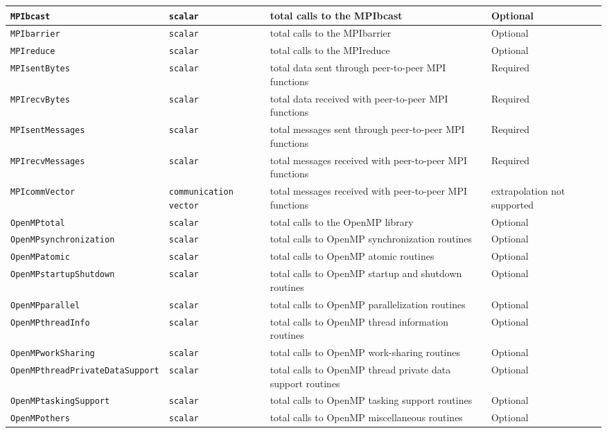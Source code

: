 \documentclass[a4paper, 10pt]{article}
\begin{document}
\begin{table}[t!]
\begin{tabular}{|p{3.8cm} | p{1.5cm} ||p{7.6cm}| p{1.7cm} |}
\hline
\texttt{MPIbcast} &\texttt{scalar} & total calls to the MPIbcast  & Optional \\
\hline
\texttt{MPIbarrier} &\texttt{scalar} & total calls to the MPIbarrier  & Optional \\
\hline
\texttt{MPIreduce} &\texttt{scalar} & total calls to the MPIreduce  & Optional \\
\hline
\texttt{MPIsentBytes} &\texttt{scalar} & total data sent through peer-to-peer MPI functions & Required \\
\hline
\texttt{MPIrecvBytes} &\texttt{scalar} & total data received with peer-to-peer MPI functions & Required \\
\hline
\texttt{MPIsentMessages} &\texttt{scalar} & total messages sent through peer-to-peer MPI functions & Required \\
\hline
\texttt{MPIrecvMessages} &\texttt{scalar} & total messages received with peer-to-peer MPI functions & Required \\
\hline
\texttt{MPIcommVector} &\texttt{communication vector} & total messages received with peer-to-peer MPI functions & extrapolation not supported \\
\hline
\texttt{OpenMPtotal} &\texttt{scalar} & total calls to the OpenMP library & Optional \\
\hline
\texttt{OpenMPsynchronization} &\texttt{scalar} & total calls to OpenMP synchronization routines & Optional \\
\hline
\texttt{OpenMPatomic} &\texttt{scalar} & total calls to OpenMP atomic routines & Optional \\
\hline
\texttt{OpenMPstartupShutdown} &\texttt{scalar} & total calls to OpenMP startup and shutdown routines & Optional \\
\hline
\texttt{OpenMPparallel} &\texttt{scalar} & total calls to OpenMP parallelization routines & Optional \\
\hline
\texttt{OpenMPthreadInfo} &\texttt{scalar} & total calls to OpenMP thread information routines & Optional \\
\hline
\texttt{OpenMPworkSharing} &\texttt{scalar} & total calls to OpenMP work-sharing routines & Optional \\
\hline
\texttt{OpenMPthreadPrivateDataSupport} &\texttt{scalar} & total calls to OpenMP thread private data support routines & Optional \\
\hline
\texttt{OpenMPtaskingSupport} &\texttt{scalar} & total calls to OpenMP tasking support routines & Optional \\
\hline
\texttt{OpenMPothers} &\texttt{scalar} & total calls to OpenMP miscellaneous routines & Optional \\
\hline
\end{tabular}
\label{tab:metrics}
  \end{table}
\end{document}
